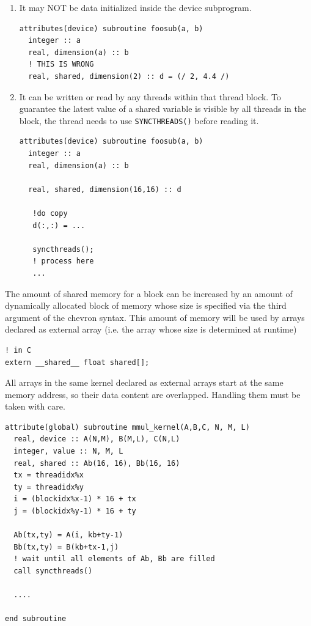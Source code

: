 \begin{enumerate}
\item It may NOT be data initialized inside the device subprogram.
\begin{lstlisting}
attributes(device) subroutine foosub(a, b)
  integer :: a
  real, dimension(a) :: b
  ! THIS IS WRONG
  real, shared, dimension(2) :: d = (/ 2, 4.4 /)

\end{lstlisting}

\item It can be written or read by any threads within that thread
  block. To guarantee the latest value of a shared variable is
  visible by all threads in the block, the thread needs to use
  \verb.SYNCTHREADS(). before reading it.

\begin{lstlisting}
attributes(device) subroutine foosub(a, b)
  integer :: a
  real, dimension(a) :: b

  real, shared, dimension(16,16) :: d 

   !do copy 
   d(:,:) = ...

   syncthreads();
   ! process here
   ...

\end{lstlisting}

\end{enumerate}


The amount of shared memory for a block can be increased by an amount
of dynamically allocated block of memory whose size is specified via
the third argument of the chevron syntax. This amount of memory will
be used by arrays declared as external array (i.e. the array whose
size is determined at runtime)
\begin{lstlisting}
! in C
extern __shared__ float shared[];
\end{lstlisting}
All arrays in the same kernel declared as external arrays start at the
same memory address, so their data content are overlapped. Handling
them must be taken with care. 

\begin{lstlisting}
attribute(global) subroutine mmul_kernel(A,B,C, N, M, L)
  real, device :: A(N,M), B(M,L), C(N,L)
  integer, value :: N, M, L
  real, shared :: Ab(16, 16), Bb(16, 16)
  tx = threadidx%x
  ty = threadidx%y
  i = (blockidx%x-1) * 16 + tx
  j = (blockidx%y-1) * 16 + ty

  Ab(tx,ty) = A(i, kb+ty-1)
  Bb(tx,ty) = B(kb+tx-1,j)
  ! wait until all elements of Ab, Bb are filled
  call syncthreads()

  ....

end subroutine
\end{lstlisting}


